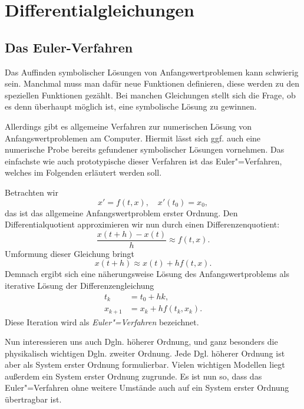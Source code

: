 
\chapter{Differentialgleichungen}

\section{Das Euler-Verfahren}

Das Auffinden symbolischer Lösungen von Anfangswertproblemen kann
schwierig sein. Manchmal muss man dafür neue Funktionen definieren,
diese werden zu den speziellen Funktionen gezählt. Bei manchen
Gleichungen stellt sich die Frage, ob es denn überhaupt möglich ist,
eine symbolische Lösung zu gewinnen.

Allerdings gibt es allgemeine Verfahren zur numerischen Lösung von
Anfangswertproblemen am Computer. Hiermit lässt sich ggf. auch eine
numerische Probe bereits gefundener symbolischer Lösungen vornehmen.
Das einfachste wie auch prototypische dieser Verfahren ist das
Euler"=Verfahren, welches im Folgenden erläutert werden soll.

Betrachten wir
\begin{equation}\label{eq:AWP-O1}
x' = f(t,x),\quad x'(t_0) = x_0,
\end{equation}
das ist das allgemeine Anfangswertproblem erster Ordnung. Den
Differentialquotient approximieren wir nun durch einen
Differenzenquotient:%
\[\frac{x(t+h)-x(t)}{h} \approx f(t,x).\]
Umformung dieser Gleichung bringt
\begin{equation}\label{eq:x-step-approx}
x(t+h)\approx x(t)+hf(t,x).
\end{equation}
Demnach ergibt sich eine näherungsweise Lösung des Anfangswertproblems
als iterative Lösung der Differenzengleichung%
\begin{align*}
t_{k} &= t_0+hk,\\
x_{k+1} &= x_k+hf(t_k,x_k).
\end{align*}
Diese Iteration wird als \emph{Euler"=Verfahren} bezeichnet.

Nun interessieren uns auch Dgln. höherer Ordnung, und ganz besonders
die physikalisch wichtigen Dgln. zweiter Ordnung. Jede Dgl. höherer
Ordnung ist aber als System erster Ordnung formulierbar. Vielen
wichtigen Modellen liegt außerdem ein System erster Ordnung zugrunde.
Es ist nun so, dass das Euler"=Verfahren ohne weitere Umstände auch
auf ein System erster Ordnung übertragbar ist.

